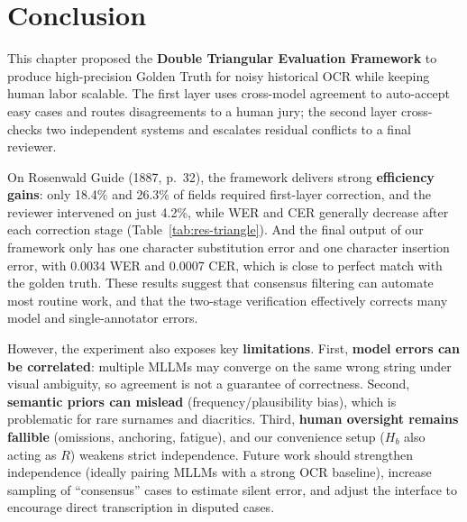 \section{Conclusion}
\label{sec:conclu-double-triangle}

This chapter proposed the \textbf{Double Triangular Evaluation Framework} to produce high-precision Golden Truth for noisy historical OCR while keeping human labor scalable. The first layer uses cross-model agreement to auto-accept easy cases and routes disagreements to a human jury; the second layer cross-checks two independent systems and escalates residual conflicts to a final reviewer.

On Rosenwald Guide (1887, p.~32), the framework delivers strong \textbf{efficiency gains}: only 18.4\% and 26.3\% of fields required first-layer correction, and the reviewer intervened on just 4.2\%, while WER and CER generally decrease after each correction stage (Table~\ref{tab:res-triangle}). And the final output of our framework only has one character substitution error and one character insertion error, with 0.0034 WER and 0.0007 CER, which is close to perfect match with the golden truth. These results suggest that consensus filtering can automate most routine work, and that the two-stage verification effectively corrects many model and single-annotator errors.

However, the experiment also exposes key \textbf{limitations}. First, \textbf{model errors can be correlated}: multiple MLLMs may converge on the same wrong string under visual ambiguity, so agreement is not a guarantee of correctness. Second, \textbf{semantic priors can mislead} (frequency/plausibility bias), which is problematic for rare surnames and diacritics. Third, \textbf{human oversight remains fallible} (omissions, anchoring, fatigue), and our convenience setup ($H_b$ also acting as $R$) weakens strict independence. Future work should strengthen independence (ideally pairing MLLMs with a strong OCR baseline), increase sampling of ``consensus'' cases to estimate silent error, and adjust the interface to encourage direct transcription in disputed cases.
